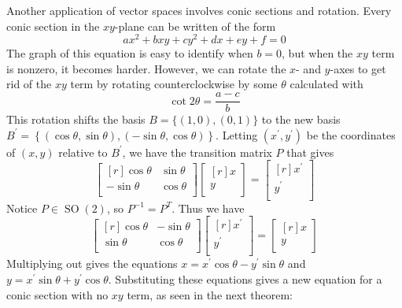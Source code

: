 Another application of vector spaces involves conic sections and rotation. Every conic section in the \(xy\)-plane can be written of the form 
\[
    ax^2 + bxy + cy^2 + dx + ey + f=0
\]
The graph of this equation is easy to identify when \(b=0\), but when the \(xy\) term is nonzero, it becomes harder. However, we can rotate the \(x\)- and \(y\)-axes to get rid of the \(xy\) term by rotating counterclockwise by some \(\theta \) calculated with 
\[
    \cot 2\theta =\frac{a-c}{b}
\]
This rotation shifts the basis \(B=\{ (1,0),(0,1) \} \) to the new basis \(B^{\prime} =\left\{ (\cos \theta ,\sin \theta ),(-\sin \theta ,\cos \theta ) \right\} \). Letting \(\left( x^{\prime} ,y^{\prime}  \right) \) be the coordinates of \((x,y)\) relative to \(B^{\prime} \), we have the transition matrix \(P\) that gives
\[
    \begin{bmatrix}[r]
        \cos \theta  &\sin \theta    \\
         -\sin \theta &\cos \theta    \\
    \end{bmatrix} \begin{bmatrix}[r]
         x \\
         y \\
    \end{bmatrix} = \begin{bmatrix}[r]
         x^{\prime}  \\
          y^{\prime} \\
    \end{bmatrix}
\]
Notice \(P\in \operatorname{SO}(2) \), so \(P ^{-1} =P^{T} \). Thus we have
\[
    \begin{bmatrix}[r]
        \cos \theta  &-\sin \theta    \\
         \sin \theta &\cos \theta    \\
    \end{bmatrix} \begin{bmatrix}[r]
        x^{\prime}  \\
        y^{\prime}  \\
   \end{bmatrix} = \begin{bmatrix}[r]
         x \\
         y \\
    \end{bmatrix}
\]
Multiplying out gives the equations \(x=x^{\prime} \cos \theta -y^{\prime} \sin \theta \) and \(y=x^{\prime} \sin \theta +y^{\prime} \cos \theta \). Substituting these equations gives a new equation for a conic section with no \(xy\) term, as seen in the next theorem:
